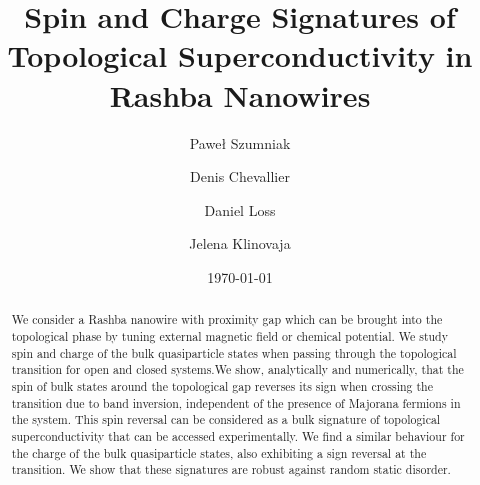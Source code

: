 \documentclass[prl,twocolumn,showpacs,floatfix,amsbsy,amsbsy,superscriptaddress]{revtex4-1}
\begin{document}
\title{Spin and Charge Signatures of Topological Superconductivity in Rashba Nanowires}

\author{Pawe\l{} Szumniak}
\author{Denis Chevallier}
\author{Daniel Loss}
\author{Jelena Klinovaja}
\date{\today}
\begin{abstract}
We consider a Rashba nanowire with proximity gap which can be brought into the topological phase by tuning external magnetic field or chemical potential. We study spin and charge of the  bulk quasiparticle states when passing through the topological transition for open and closed systems.We show, analytically and numerically, that the  spin of bulk states around the topological gap reverses its sign when crossing the transition due to band inversion, independent of the presence of  Majorana fermions in the system. 
This  spin reversal can be considered as a bulk signature of  topological superconductivity  that can be accessed experimentally.
We find a similar behaviour for the charge of the bulk quasiparticle states, also exhibiting a sign reversal at the transition. We show that these signatures are robust against random static disorder.
\end{abstract}


\maketitle
\end{document}
